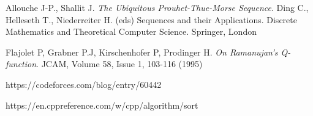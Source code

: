 \begin{thebibliography}{}
 Allouche J-P., Shallit J. \textit{The Ubiquitous Prouhet-Thue-Morse Sequence}. Ding C., Helleseth T., Niederreiter H. (eds) Sequences and their Applications. Discrete Mathematics and Theoretical Computer Science. Springer, London

\newpage

 Flajolet P, Grabner P.J, Kirschenhofer P, Prodinger H. \textit{On Ramanujan's Q-function}. JCAM, Volume 58, Issue 1, 103-116 (1995)

 https://codeforces.com/blog/entry/60442

 https://en.cppreference.com/w/cpp/algorithm/sort

\end{thebibliography}

